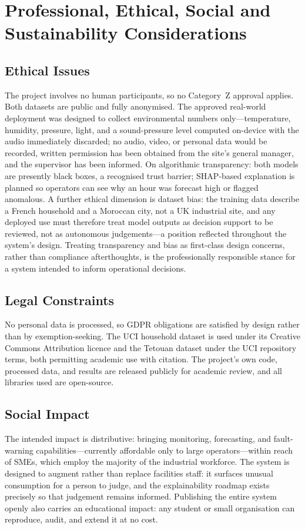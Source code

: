 \documentclass[11pt,a4paper]{article}
\begin{document}
\section{Professional, Ethical, Social and Sustainability Considerations}

\subsection{Ethical Issues}
The project involves no human participants, so no Category~Z approval applies.
Both datasets are public and fully anonymised. The approved real-world
deployment was designed to collect environmental numbers only---temperature,
humidity, pressure, light, and a sound-pressure level computed on-device with
the audio immediately discarded; no audio, video, or personal data would be
recorded, written permission has been obtained from the site's general manager, and the supervisor
has been informed. On algorithmic transparency: both models are presently black
boxes, a recognised trust barrier; SHAP-based explanation
\cite{lundberg2017unified} is planned so operators can see why an hour was
forecast high or flagged anomalous. A further ethical dimension is dataset bias:
the training data describe a French household and a Moroccan city, not a UK
industrial site, and any deployed use must therefore treat model outputs as
decision support to be reviewed, not as autonomous judgements---a position
reflected throughout the system's design. Treating transparency and bias as first-class design concerns, rather than compliance afterthoughts, is the professionally responsible stance for a system intended to inform operational decisions.

\subsection{Legal Constraints}
No personal data is processed, so GDPR obligations are satisfied by design
rather than by exemption-seeking. The UCI household dataset
\cite{hebrail2012individual} is used under its Creative Commons Attribution
licence and the Tetouan dataset under the UCI repository terms, both permitting
academic use with citation. The project's own code, processed data, and results are released publicly for
academic review, and all libraries used are open-source.

\subsection{Social Impact}
The intended impact is distributive: bringing monitoring, forecasting, and
fault-warning capabilities---currently affordable only to large
operators---within reach of SMEs, which employ the majority of the industrial
workforce. The system is designed to augment rather than replace facilities
staff: it surfaces unusual consumption for a person to judge, and the
explainability roadmap exists precisely so that judgement remains informed.
Publishing the entire system openly also carries an educational impact: any
student or small organisation can reproduce, audit, and extend it at no cost.
\end{document}
